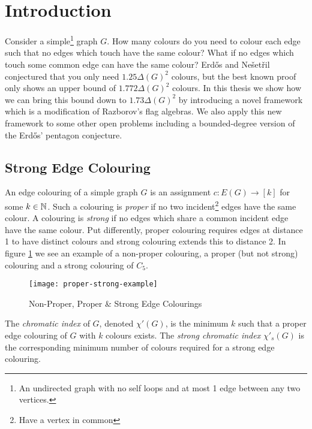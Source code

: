 \chapter*{Introduction}

Consider a simple\footnote{An undirected graph with no self loops and at most 1 edge between any two
vertices.} graph $G$. How many colours do you need to colour each edge such that no edges which touch
have the same colour? What if no edges which touch some common edge can have the same colour?
Erd\H{o}s and Nešetřil conjectured that you only need $1.25\Delta(G)^2$ colours, but
the best known proof only shows an upper bound of $1.772\Delta(G)^2$ colours. In this thesis
we show how we can bring this bound down to $1.73\Delta(G)^2$ by introducing a novel framework
which is a modification of Razborov's flag algebras. We also apply this new framework
to some other open problems including a bounded-degree version of the
Erd\H{o}s' pentagon conjecture.

\section*{Strong Edge Colouring}
\label{sec:intro_strong_edge_coloring}

An edge colouring of a simple graph $G$ is an assignment $c\colon E(G) \to [k]$
for some $k\in\mathbb{N}$. Such a colouring is \textit{proper} if no two incident\footnote{Have a vertex in common}
edges have the same colour.
A colouring is \textit{strong} if no edges which share a common incident edge have
the same colour. Put differently, proper colouring requires edges at distance 1 to have distinct
colours and strong colouring extends this to distance 2.
In figure \ref{fig:proper-strong-example} we see an example of a non-proper colouring,
a proper (but not strong) colouring and a strong colouring of $C_5$.

\begin{figure}[h]
    \centering
    \texttt{[image: proper-strong-example]}
    \caption{Non-Proper, Proper \& Strong Edge Colourings}
    \label{fig:proper-strong-example}
\end{figure}

The \textit{chromatic index} of $G$, denoted $\chi'(G)$, is the minimum $k$ such that a proper edge
colouring of $G$ with $k$ colours exists. The \textit{strong chromatic index} $\chi'_s(G)$
is the corresponding minimum number of colours required for a strong edge colouring.

